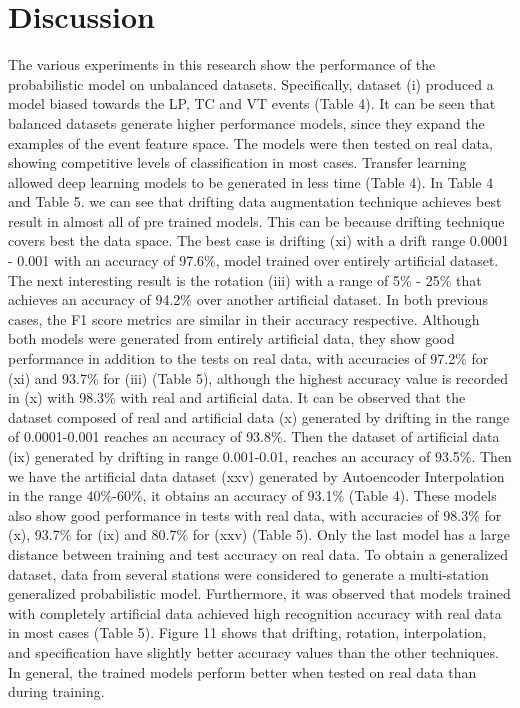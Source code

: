 \documentclass[journal]{IEEEtran}
\begin{document}
\section{Discussion}
The various experiments in this research show the performance of the probabilistic model on unbalanced datasets. Specifically, dataset (i) produced a model biased towards the LP, TC and VT events (Table 4).
It can be seen that balanced datasets generate higher performance models, since they expand the examples of the event feature space. The models were then tested on real data, showing competitive levels of classification in most cases. Transfer learning allowed deep learning models to be generated in less time (Table 4).
In Table 4 and Table 5. we can see that drifting data augmentation technique achieves best result in almost all of pre trained models. This can be because drifting technique covers best the data space. The best case is drifting (xi) with a drift range 0.0001 - 0.001 with an accuracy of 97.6\%, model trained over entirely artificial dataset. The next interesting result is the rotation (iii) with a range of 5\% - 25\% that achieves an accuracy of 94.2\% over another artificial dataset. In both previous cases, the F1 score metrics are similar in their accuracy respective. Although both models were generated from entirely artificial data, they show good performance in addition to the tests on real data, with accuracies of 97.2\% for (xi) and 93.7\% for (iii) (Table 5), although the highest accuracy value is recorded in (x) with 98.3\% with real and artificial data.
It can be observed that the dataset composed of real and artificial data (x) generated by drifting in the range of 0.0001-0.001 reaches an accuracy of 93.8\%. Then the dataset of artificial data (ix) generated by drifting in range 0.001-0.01, reaches an accuracy of 93.5\%. Then we have the artificial data dataset (xxv) generated by Autoencoder Interpolation in the range 40\%-60\%, it obtains an accuracy of 93.1\% (Table 4). These models also show good performance in tests with real data, with accuracies of 98.3\% for (x), 93.7\% for (ix) and 80.7\% for (xxv) (Table 5). Only the last model has a large distance between training and test accuracy on real data.
To obtain a generalized dataset, data from several stations were considered to generate a multi-station generalized probabilistic model. Furthermore, it was observed that models trained with completely artificial data achieved high recognition accuracy with real data in most cases (Table 5).
Figure 11 shows that drifting, rotation, interpolation, and specification have slightly better accuracy values than the other techniques. In general, the trained models perform better when tested on real data than during training.
\end{document}
